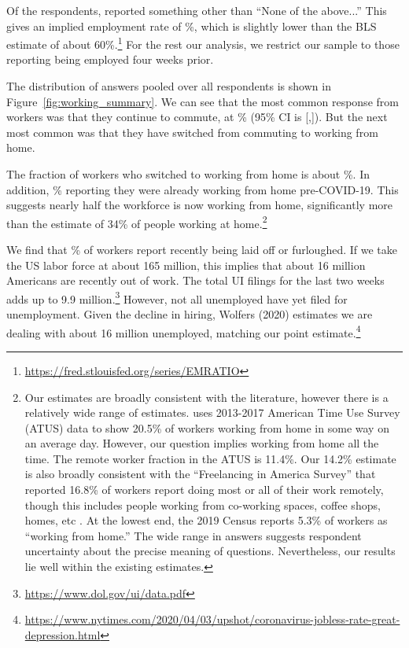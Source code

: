 \documentclass[12pt]{article}
\begin{document}
Of the respondents, \numObsWorking{} reported something other than ``None of the above...''
This gives an implied employment rate of \LFPRhat{}\%, which is slightly lower than the BLS estimate of about 60\%.\footnote{
  \url{https://fred.stlouisfed.org/series/EMRATIO}
}
For the rest our analysis, we restrict our sample to those reporting being employed four weeks prior.

The distribution of answers pooled over all respondents is shown in Figure~\ref{fig:working_summary}. 
We can see that the most common response from workers was that they continue to commute, at \stillCommute{}\% (95\% CI is [\stillCommuteLB,\stillCommuteUB]). 
But the next most common was that they have switched from commuting to working from home. 

The fraction of workers who switched to working from home is about \WFH{}\%.  In addition,  \alreadyWFH{}\% reporting they were already working from home pre-COVID-19.  This suggests nearly half the workforce is now working from home, significantly more than the \cite{dingel2020} estimate of 34\% of people working at home.\footnote{
Our estimates are broadly consistent with the literature, however there is a relatively wide range of estimates.
\cite{krantz2019did} uses 2013-2017 American Time Use Survey (ATUS) data to show 20.5\% of workers working from home in some way on an average day.
However, our question implies working from home all the time.
The remote worker fraction in the ATUS is 11.4\%.
Our 14.2\% estimate is also broadly consistent with the ``Freelancing in America Survey'' that reported 16.8\% of workers report doing most or all of their work remotely, though this includes people working from co-working spaces, coffee shops, homes, etc \citep{ozimek2020}.
At the lowest end, the 2019 Census reports 5.3\% of workers as ``working from home.''
The wide range in answers suggests respondent uncertainty about the precise meaning of questions. Nevertheless, our results lie well within the existing estimates.
}

We find that \LaidOff{}\% of workers report recently being laid off or furloughed. If we take the US labor force at about 165 million, this implies that about 16 million Americans are recently out of work.
The total UI filings for the last two weeks adds up to 9.9 million.\footnote{
  \url{https://www.dol.gov/ui/data.pdf}
}
However, not all unemployed have yet filed for unemployment.
Given the decline in hiring, Wolfers (2020) estimates we are dealing with about 16 million unemployed, matching our point estimate.\footnote{
  \url{https://www.nytimes.com/2020/04/03/upshot/coronavirus-jobless-rate-great-depression.html}
}
\end{document}
